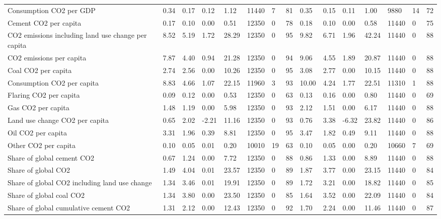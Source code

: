 \begin{longtable}{lllllllllllllll}
\addlinespace
Consumption CO2 per GDP & 0.34 & 0.17 & 0.12 & 1.12 & 11440 & 7 & 81 & 0.35 & 0.15 & 0.11 & 1.00 & 9880 & 14 & 72\\
Cement CO2 per capita & 0.17 & 0.10 & 0.00 & 0.51 & 12350 & 0 & 78 & 0.18 & 0.10 & 0.00 & 0.58 & 11440 & 0 & 75\\
CO2 emissions including land use change per capita & 8.52 & 5.19 & 1.72 & 28.29 & 12350 & 0 & 95 & 9.82 & 6.71 & 1.96 & 42.24 & 11440 & 0 & 88\\
CO2 emissions per capita & 7.87 & 4.40 & 0.94 & 21.28 & 12350 & 0 & 94 & 9.06 & 4.55 & 1.89 & 20.87 & 11440 & 0 & 88\\
Coal CO2 per capita & 2.74 & 2.56 & 0.00 & 10.26 & 12350 & 0 & 95 & 3.08 & 2.77 & 0.00 & 10.15 & 11440 & 0 & 88\\
\addlinespace
Consumption CO2 per capita & 8.83 & 4.66 & 1.07 & 22.15 & 11960 & 3 & 93 & 10.00 & 4.24 & 1.77 & 22.51 & 11310 & 1 & 88\\
Flaring CO2 per capita & 0.09 & 0.12 & 0.00 & 0.53 & 12350 & 0 & 63 & 0.13 & 0.16 & 0.00 & 0.80 & 11440 & 0 & 69\\
Gas CO2 per capita & 1.48 & 1.19 & 0.00 & 5.98 & 12350 & 0 & 93 & 2.12 & 1.51 & 0.00 & 6.17 & 11440 & 0 & 88\\
Land use change CO2 per capita & 0.65 & 2.02 & -2.21 & 11.16 & 12350 & 0 & 93 & 0.76 & 3.38 & -6.32 & 23.82 & 11440 & 0 & 86\\
Oil CO2 per capita & 3.31 & 1.96 & 0.39 & 8.81 & 12350 & 0 & 95 & 3.47 & 1.82 & 0.49 & 9.11 & 11440 & 0 & 88\\
\addlinespace
Other CO2 per capita & 0.10 & 0.05 & 0.01 & 0.20 & 10010 & 19 & 63 & 0.10 & 0.05 & 0.00 & 0.20 & 10660 & 7 & 69\\
Share of global cement CO2 & 0.67 & 1.24 & 0.00 & 7.72 & 12350 & 0 & 88 & 0.86 & 1.33 & 0.00 & 8.89 & 11440 & 0 & 88\\
Share of global CO2 & 1.49 & 4.04 & 0.01 & 23.57 & 12350 & 0 & 89 & 1.87 & 3.77 & 0.00 & 23.15 & 11440 & 0 & 84\\
Share of global CO2 including land use change & 1.34 & 3.46 & 0.01 & 19.91 & 12350 & 0 & 89 & 1.72 & 3.21 & 0.00 & 18.82 & 11440 & 0 & 85\\
Share of global coal CO2 & 1.34 & 3.80 & 0.00 & 23.50 & 12350 & 0 & 85 & 1.64 & 3.52 & 0.00 & 22.09 & 11440 & 0 & 84\\
\addlinespace
Share of global cumulative cement CO2 & 1.31 & 2.12 & 0.00 & 12.43 & 12350 & 0 & 92 & 1.70 & 2.24 & 0.00 & 11.46 & 11440 & 0 & 87\\

\end{longtable}
